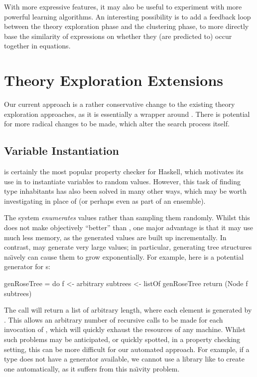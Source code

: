 With more expressive features, it may also be useful to experiment with more
powerful learning algorithms. An interesting possibility is to add a feedback
loop between the theory exploration phase and the clustering phase, to more
directly base the similarity of expressions on whether they (are predicted to)
occur together in equations.

\section{Theory Exploration Extensions}

Our current approach is a rather conservative change to the existing theory
exploration approaches, as it is essentially a wrapper around \quickspec{}.
There is potential for more radical changes to be made, which alter the search
process itself.

\subsection{Variable Instantiation}

\quickcheck{} is certainly the most popular property checker for Haskell, which
motivates its use in \quickspec{} to instantiate variables to random
values. However, this task of finding type inhabitants has also been solved in
many other ways, which may be worth investigating in place of \quickcheck{} (or
perhaps even as part of an ensemble).

The \smallcheck{} system \cite{runciman2008smallcheck} \emph{enumerates}
values rather than sampling them randomly. Whilst this does not make
\smallcheck{} objectively ``better'' than \quickcheck{}, one major advantage
is that it may use much less memory, as the generated values are built up
incrementally. In contrast, \quickcheck{} may generate very large values; in
particular, generating tree structures na\"{\i}vely can cause them to grow
exponentially. For example, here is a potential generator for s:

\begin{haskell}
genRoseTree = do f        <- arbitrary
                 subtrees <- listOf genRoseTree
                 return (Node f subtrees)
\end{haskell}

The  call will return a list of arbitrary length, where
each element is generated by . This allows an arbitrary number
of recursive calls to be made for each invocation of , which
will quickly exhaust the resources of any machine. Whilst such problems may be
anticipated, or quickly spotted, in a property checking setting, this can be
more difficult for our automated approach. For example, if a type does not have
a generator available, we cannot use a library like  to create one
automatically, as it suffers from this na\"{\i}vity problem.

